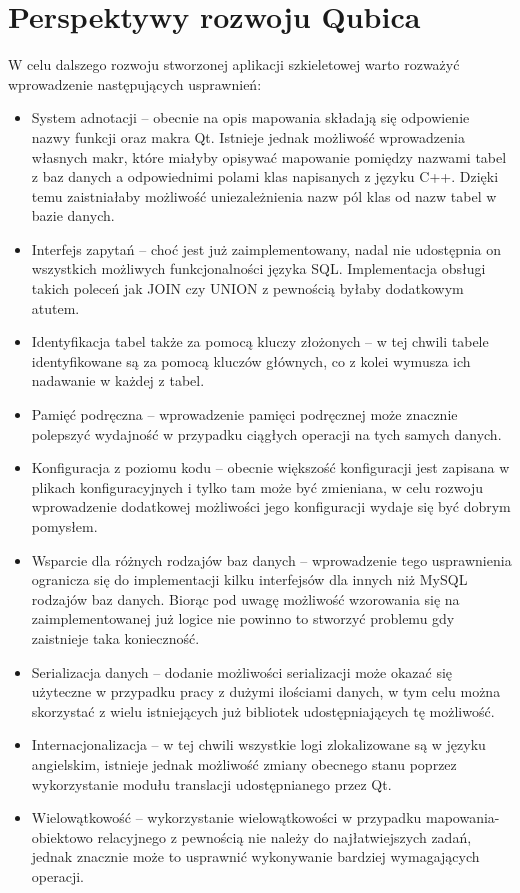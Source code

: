 \documentclass[12pt]{report}
\begin{document}
\section{Perspektywy rozwoju Qubica} \label{perspektywyqubic}

W celu dalszego rozwoju stworzonej aplikacji szkieletowej warto rozważyć wprowadzenie następujących usprawnień:

\begin{itemize}
\item System adnotacji -- obecnie na opis mapowania składają się odpowienie nazwy funkcji oraz makra Qt. Istnieje jednak możliwość wprowadzenia własnych makr, które
miałyby opisywać mapowanie pomiędzy nazwami tabel z baz danych a odpowiednimi polami klas napisanych z języku C++. Dzięki temu zaistniałaby możliwość uniezależnienia
nazw pól klas od nazw tabel w bazie danych.
\item Interfejs zapytań -- choć jest już zaimplementowany, nadal nie udostępnia on wszystkich możliwych funkcjonalności języka SQL. Implementacja obsługi takich poleceń
jak JOIN czy UNION z pewnością byłaby dodatkowym atutem.
\item Identyfikacja tabel także za pomocą kluczy złożonych -- w tej chwili tabele identyfikowane są za pomocą kluczów głównych, co z kolei wymusza ich nadawanie w każdej
z tabel.
\item Pamięć podręczna -- wprowadzenie pamięci podręcznej może znacznie polepszyć wydajność w przypadku ciągłych operacji na tych samych danych.
\item Konfiguracja z poziomu kodu -- obecnie większość konfiguracji jest zapisana w plikach konfiguracyjnych i tylko tam może być zmieniana, w celu rozwoju wprowadzenie
dodatkowej możliwości jego konfiguracji wydaje się być dobrym pomysłem.
\item Wsparcie dla różnych rodzajów baz danych -- wprowadzenie tego usprawnienia ogranicza się do implementacji kilku interfejsów dla innych niż MySQL rodzajów baz 
danych. Biorąc pod uwagę możliwość wzorowania się na zaimplementowanej już logice nie powinno to stworzyć problemu gdy zaistnieje taka konieczność.
\item Serializacja danych -- dodanie możliwości serializacji może okazać się użyteczne w przypadku pracy z dużymi ilościami danych, w tym celu można skorzystać z wielu
istniejących już bibliotek udostępniających tę możliwość.
\item Internacjonalizacja -- w tej chwili wszystkie logi zlokalizowane są w języku angielskim, istnieje jednak możliwość zmiany obecnego stanu poprzez wykorzystanie modułu
translacji udostępnianego przez Qt.
\item Wielowątkowość -- wykorzystanie wielowątkowości w przypadku mapowania-obiektowo relacyjnego z pewnością nie należy do najłatwiejszych zadań, jednak znacznie
może to usprawnić wykonywanie bardziej wymagających operacji.
\end{itemize}
\end{document}

